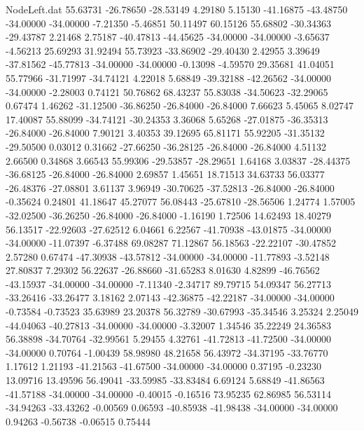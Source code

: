 \begin{filecontents}{NodeLeft.dat}
  55.63731  -26.78650  -28.53149     4.29180    5.15130  -41.16875  -43.48750  -34.00000  -34.00000   -7.21350   -5.46851   50.11497   60.15126
  55.68802  -30.34363  -29.43787     2.21468    2.75187  -40.47813  -44.45625  -34.00000  -34.00000   -3.65637   -4.56213   25.69293   31.92494
  55.73923  -33.86902  -29.40430     2.42955    3.39649  -37.81562  -45.77813  -34.00000  -34.00000   -0.13098   -4.59570   29.35681   41.04051
  55.77966  -31.71997  -34.74121     4.22018    5.68849  -39.32188  -42.26562  -34.00000  -34.00000   -2.28003    0.74121   50.76862   68.43237
  55.83038  -34.50623  -32.29065     0.67474    1.46262  -31.12500  -36.86250  -26.84000  -26.84000    7.66623    5.45065    8.02747   17.40087
  55.88099  -34.74121  -30.24353     3.36068    5.65268  -27.01875  -36.35313  -26.84000  -26.84000    7.90121    3.40353   39.12695   65.81171
  55.92205  -31.35132  -29.50500     0.03012    0.31662  -27.66250  -36.28125  -26.84000  -26.84000    4.51132    2.66500    0.34868    3.66543
  55.99306  -29.53857  -28.29651     1.64168    3.03837  -28.44375  -36.68125  -26.84000  -26.84000    2.69857    1.45651   18.71513   34.63733
  56.03377  -26.48376  -27.08801     3.61137    3.96949  -30.70625  -37.52813  -26.84000  -26.84000   -0.35624    0.24801   41.18647   45.27077
  56.08443  -25.67810  -28.56506     1.24774    1.57005  -32.02500  -36.26250  -26.84000  -26.84000   -1.16190    1.72506   14.62493   18.40279
  56.13517  -22.92603  -27.62512     6.04661    6.22567  -41.70938  -43.01875  -34.00000  -34.00000  -11.07397   -6.37488   69.08287   71.12867
  56.18563  -22.22107  -30.47852     2.57280    0.67474  -47.30938  -43.57812  -34.00000  -34.00000  -11.77893   -3.52148   27.80837    7.29302
  56.22637  -26.88660  -31.65283     8.01630    4.82899  -46.76562  -43.15937  -34.00000  -34.00000   -7.11340   -2.34717   89.79715   54.09347
  56.27713  -33.26416  -33.26477     3.18162    2.07143  -42.36875  -42.22187  -34.00000  -34.00000   -0.73584   -0.73523   35.63989   23.20378
  56.32789  -30.67993  -35.34546     3.25324    2.25049  -44.04063  -40.27813  -34.00000  -34.00000   -3.32007    1.34546   35.22249   24.36583
  56.38898  -34.70764  -32.99561     5.29455    4.32761  -41.72813  -41.72500  -34.00000  -34.00000    0.70764   -1.00439   58.98980   48.21658
  56.43972  -34.37195  -33.76770     1.17612    1.21193  -41.21563  -41.67500  -34.00000  -34.00000    0.37195   -0.23230   13.09716   13.49596
  56.49041  -33.59985  -33.83484     6.69124    5.68849  -41.86563  -41.57188  -34.00000  -34.00000   -0.40015   -0.16516   73.95235   62.86985
  56.53114  -34.94263  -33.43262    -0.00569    0.06593  -40.85938  -41.98438  -34.00000  -34.00000    0.94263   -0.56738   -0.06515    0.75444

\end{filecontents}

